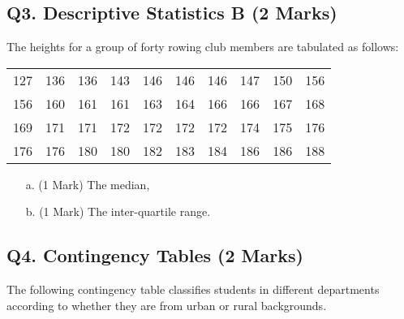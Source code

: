 \documentclass[a4paper,12pt]{article}
\begin{document}
\subsection*{Q3. Descriptive Statistics B (2 Marks)} %
The heights for a group of forty rowing club members are tabulated as follows:

    \begin{table}[ht]
\begin{center}
\begin{tabular}{|rrrrrrrrrr|}

  \hline
127& 136& 136& 143& 146& 146& 146& 147& 150& 156\\
156& 160& 161& 161& 163& 164& 166& 166& 167& 168\\
169& 171& 171& 172& 172& 172& 172& 174& 175& 176\\
176& 176& 180& 180& 182& 183& 184& 186& 186& 188\\
   \hline
\end{tabular}
\end{center}
\end{table}
\vspace{-0.5cm}
\begin{itemize}
\item[a.] (1 Mark) The median,
\item[b.] (1 Mark) The inter-quartile range.
\end{itemize}
%
%

\bigskip
\subsection*{Q4. Contingency Tables (2 Marks)} %

The following contingency table classifies students in different
departments according to whether they are from urban or rural backgrounds.
\end{document}
